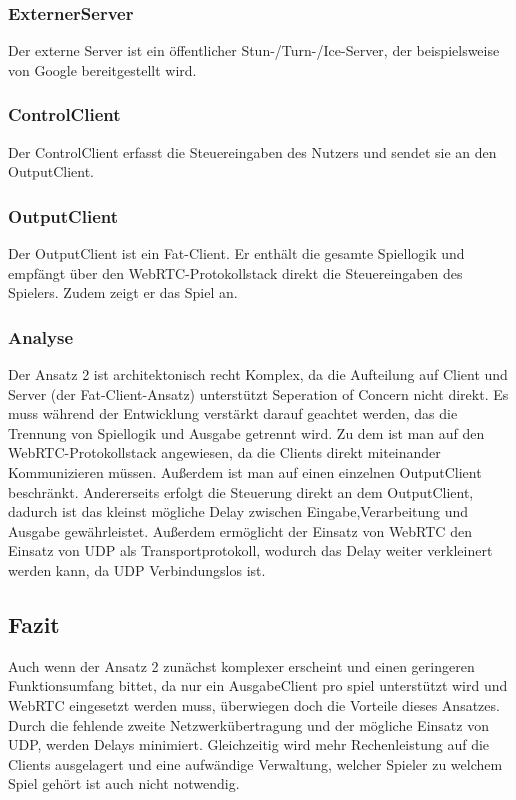 \subsubsection{ExternerServer}
Der externe Server ist ein öffentlicher Stun-/Turn-/Ice-Server, der beispielsweise von Google bereitgestellt wird.
\subsubsection{ControlClient}
Der ControlClient erfasst die Steuereingaben des Nutzers und sendet sie an den OutputClient.
\subsubsection{OutputClient}
Der OutputClient ist ein Fat-Client. Er enthält die gesamte Spiellogik und empfängt über den WebRTC-Protokollstack direkt die Steuereingaben des Spielers. Zudem zeigt er das Spiel an.
\subsubsection{Analyse}
Der Ansatz 2 ist architektonisch recht Komplex, da die Aufteilung auf Client und Server (der Fat-Client-Ansatz) unterstützt Seperation of Concern nicht direkt. Es muss während der Entwicklung verstärkt darauf geachtet werden, das die Trennung von Spiellogik und Ausgabe getrennt wird. Zu dem ist man auf den WebRTC-Protokollstack angewiesen, da die Clients direkt miteinander Kommunizieren müssen. Außerdem ist man auf einen einzelnen OutputClient beschränkt. Andererseits erfolgt die Steuerung direkt an dem OutputClient, dadurch ist das kleinst mögliche Delay zwischen Eingabe,Verarbeitung und Ausgabe gewährleistet. Außerdem ermöglicht der Einsatz von WebRTC den Einsatz von UDP als Transportprotokoll, wodurch das Delay weiter verkleinert werden kann, da UDP Verbindungslos ist.
\subsection{Fazit}
Auch wenn der Ansatz 2 zunächst komplexer erscheint und einen geringeren Funktionsumfang bittet, da nur ein AusgabeClient pro spiel unterstützt wird und WebRTC eingesetzt werden muss, überwiegen doch die Vorteile dieses Ansatzes. Durch die fehlende zweite Netzwerkübertragung und der mögliche Einsatz von UDP, werden Delays minimiert. Gleichzeitig wird mehr Rechenleistung auf die Clients ausgelagert und eine aufwändige Verwaltung, welcher Spieler zu welchem Spiel gehört ist auch nicht notwendig.


